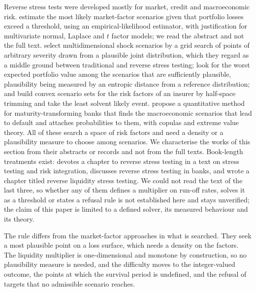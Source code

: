 Reverse stress tests were developed mostly for market, credit and macroeconomic risk. \citet{glasserman2015} estimate the most likely market-factor scenarios given that portfolio losses exceed a threshold, using an empirical-likelihood estimator, with justification for multivariate normal, Laplace and $t$ factor models; we read the abstract and not the full text. \citet{flood2015} select multidimensional shock scenarios by a grid search of points of arbitrary severity drawn from a plausible joint distribution, which they regard as a middle ground between traditional and reverse stress testing; \citet{breuercsiszar2013} look for the worst expected portfolio value among the scenarios that are sufficiently plausible, plausibility being measured by an entropic distance from a reference distribution; and \citet{mcneilsmith2012} build convex scenario sets for the risk factors of an insurer by half-space trimming and take the least solvent likely event. \citet{grundke2018} propose a quantitative method for maturity-transforming banks that finds the macroeconomic scenarios that lead to default and attaches probabilities to them, with copulas and extreme value theory. All of these search a space of risk factors and need a density or a plausibility measure to choose among scenarios. We characterise the works of this section from their abstracts or records and not from the full texts. Book-length treatments exist: \citet{bellini2017} devotes a chapter to reverse stress testing in a text on stress testing and risk integration, \citet{gann2021} discusses reverse stress testing in banks, and \citet{almehed2021} wrote a chapter titled reverse liquidity stress testing. We could not read the text of the last three, so whether any of them defines a multiplier on run-off rates, solves it as a threshold or states a refusal rule is not established here and stays unverified; the claim of this paper is limited to a defined solver, its measured behaviour and its theory.

The rule differs from the market-factor approaches in what is searched. They seek a most plausible point on a loss surface, which needs a density on the factors. The liquidity multiplier is one-dimensional and monotone by construction, so no plausibility measure is needed, and the difficulty moves to the integer-valued outcome, the points at which the survival period is undefined, and the refusal of targets that no admissible scenario reaches.
